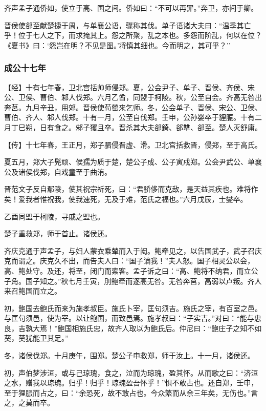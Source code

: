 \documentclass[]{article}
\begin{document}
齐声孟子通侨如，使立于高、国之间。侨如曰：``不可以再罪。''奔卫，亦间于卿。

晋侯使郤至献楚捷于周，与单襄公语，骤称其伐。单子语诸大夫曰：``温季其亡乎！位于七人之下，而求掩其上。怨之所聚，乱之本也。多怨而阶乱，何以在位？《夏书》曰：`怨岂在明？不见是图。'将慎其细也。今而明之，其可乎？''

\hypertarget{header-n1763}{%
\subsubsection{成公十七年}\label{header-n1763}}

【经】十有七年春，卫北宫括帅师侵郑。夏，公会尹子、单子、晋侯、齐侯、宋公、卫侯、曹伯、邾人伐郑。六月乙酋，同盟于柯陵。秋，公至自会。齐高无咎出奔莒。九月辛丑，用郊。晋侯使荀罃来乞师。冬，公会单子、晋侯、宋公、卫侯、曹伯、齐人、邾人伐郑。十有一月，公至自伐郑。壬申，公孙婴卒于貍脤。十有二月丁巳朔，日有食之。邾子玃且卒。晋杀其大夫郤錡、郤犨、郤至。楚人灭舒庸。

【传】十七年春，王正月，郑子驷侵晋虚、滑。卫北宫括救晋，侵郑，至于高氏。

夏五月，郑大子髡顽、侯孺为质于楚，楚公子成、公子寅戍郑。公会尹武公、单襄公及诸侯伐郑，自戏童至于曲洧。

晋范文子反自鄢陵，使其祝宗祈死，曰：``君骄侈而克敌，是天益其疾也。难将作矣！爱我者惟祝我，使我速死，无及于难，范氏之福也。''六月戊辰，士燮卒。

乙酉同盟于柯陵，寻戚之盟也。

楚子重救郑，师于首止。诸侯还。

齐庆克通于声孟子，与妇人蒙衣乘辇而入于闳。鲍牵见之，以告国武子，武子召庆克而谓之。庆克久不出，而告夫人曰：``国子谪我！''夫人怒。国子相灵公以会，高、鲍处守。及还，将至，闭门而索客。孟子诉之曰：``高、鲍将不纳君，而立公子角。国子知之。''秋七月壬寅，刖鲍牵而逐高无咎。无咎奔莒，高弱以卢叛。齐人来召鲍国而立之。

初，鲍国去鲍氏而来为施孝叔臣。施氏卜宰，匡句须吉。施氏之宰，有百室之邑。与匡句须邑，使为宰。以让鲍国，而致邑焉。施孝叔曰：``子实吉。''对曰：``能与忠良，吉孰大焉！''鲍国相施氏忠，故齐人取以为鲍氏后。仲尼曰：``鲍庄子之知不如葵，葵犹能卫其足。''

冬，诸侯伐郑。十月庚午，围郑。楚公子申救郑，师于汝上。十一月，诸侯还。

初，声伯梦涉洹，或与己琼瑰，食之，泣而为琼瑰，盈其怀。从而歌之曰：``济洹之水，赠我以琼瑰。归乎！归乎！琼瑰盈吾怀乎！''惧不敢占也。还自郑，壬申，至于狸脤而占之，曰：``余恐死，故不敢占也。今众繁而从余三年矣，无伤也。''言之，之莫而卒。
\end{document}
